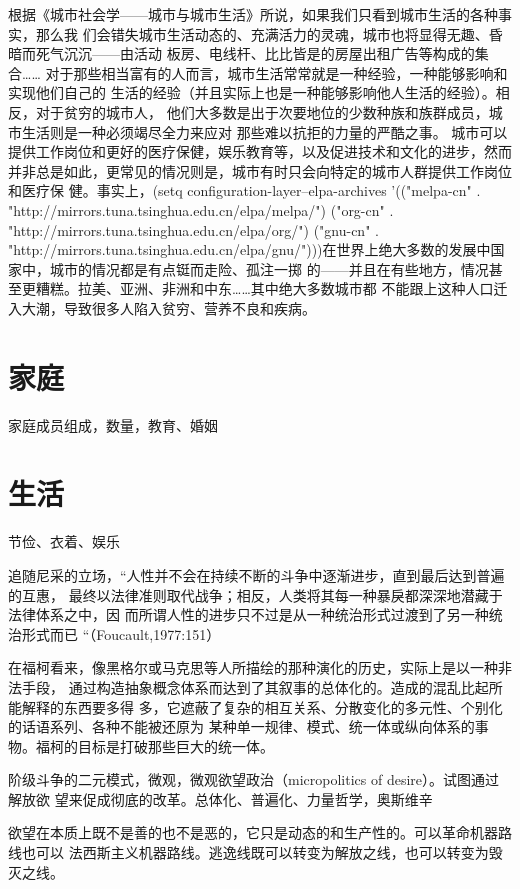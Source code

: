 根据《城市社会学——城市与城市生活》所说，如果我们只看到城市生活的各种事实，那么我
们会错失城市生活动态的、充满活力的灵魂，城市也将显得无趣、昏暗而死气沉沉——由活动
板房、电线杆、比比皆是的房屋出租广告等构成的集合……
对于那些相当富有的人而言，城市生活常常就是一种经验，一种能够影响和实现他们自己的
生活的经验（并且实际上也是一种能够影响他人生活的经验）。相反，对于贫穷的城市人，
他们大多数是出于次要地位的少数种族和族群成员，城市生活则是一种必须竭尽全力来应对
那些难以抗拒的力量的严酷之事。
城市可以提供工作岗位和更好的医疗保健，娱乐教育等，以及促进技术和文化的进步，然而
并非总是如此，更常见的情况则是，城市有时只会向特定的城市人群提供工作岗位和医疗保
健。事实上，(setq configuration-layer--elpa-archives
    '(("melpa-cn" . "http://mirrors.tuna.tsinghua.edu.cn/elpa/melpa/")
      ("org-cn"   . "http://mirrors.tuna.tsinghua.edu.cn/elpa/org/")
      ("gnu-cn"   . "http://mirrors.tuna.tsinghua.edu.cn/elpa/gnu/")))在世界上绝大多数的发展中国家中，城市的情况都是有点铤而走险、孤注一掷
的——并且在有些地方，情况甚至更糟糕。拉美、亚洲、非洲和中东……其中绝大多数城市都
不能跟上这种人口迁入大潮，导致很多人陷入贫穷、营养不良和疾病。

\section{家庭}
家庭成员组成，数量，教育、婚姻

\section{生活}
节俭、衣着、娱乐


追随尼采的立场，“人性并不会在持续不断的斗争中逐渐进步，直到最后达到普遍的互惠，
最终以法律准则取代战争；相反，人类将其每一种暴戾都深深地潜藏于法律体系之中，因
而所谓人性的进步只不过是从一种统治形式过渡到了另一种统治形式而已
“（Foucault,1977:151）


在福柯看来，像黑格尔或马克思等人所描绘的那种演化的历史，实际上是以一种非法手段，
通过构造抽象概念体系而达到了其叙事的总体化的。造成的混乱比起所能解释的东西要多得
多，它遮蔽了复杂的相互关系、分散变化的多元性、个别化的话语系列、各种不能被还原为
某种单一规律、模式、统一体或纵向体系的事物。福柯的目标是打破那些巨大的统一体。

阶级斗争的二元模式，微观，微观欲望政治（micropolitics of desire）。试图通过解放欲
望来促成彻底的改革。总体化、普遍化、力量哲学，奥斯维辛

欲望在本质上既不是善的也不是恶的，它只是动态的和生产性的。可以革命机器路线也可以
法西斯主义机器路线。逃逸线既可以转变为解放之线，也可以转变为毁灭之线。

